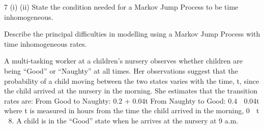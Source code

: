 \documentclass[a4paper,12pt]{article}
\begin{document}

7
(i)
(ii)
State the condition needed for a Markov Jump Process to be time
inhomogeneous.

Describe the principal difficulties in modelling using a Markov Jump Process
with time inhomogeneous rates.

A multi-tasking worker at a children’s nursery observes whether children are being
“Good” or “Naughty” at all times. Her observations suggest that the probability of a
child moving between the two states varies with the time, t, since the child arrived at
the nursery in the morning. She estimates that the transition rates are:
From Good to Naughty: 0.2 + 0.04t
From Naughty to Good: 0.4  0.04t
where t is measured in hours from the time the child arrived in the morning,
0  t  8.
A child is in the “Good” state when he arrives at the nursery at 9 a.m.
\end{document}
